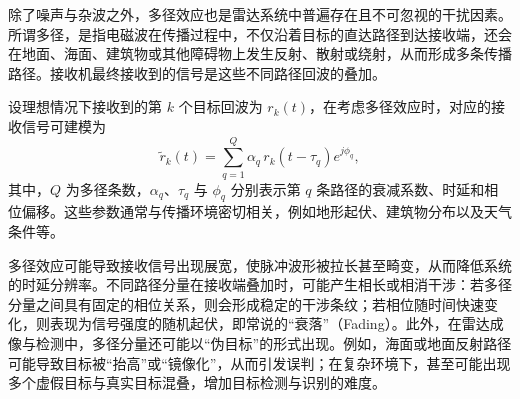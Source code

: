 除了噪声与杂波之外，多径效应也是雷达系统中普遍存在且不可忽视的干扰因素。所谓多径，是指电磁波在传播过程中，不仅沿着目标的直达路径到达接收端，还会在地面、海面、建筑物或其他障碍物上发生反射、散射或绕射，从而形成多条传播路径。接收机最终接收到的信号是这些不同路径回波的叠加。

设理想情况下接收到的第 \( k \) 个目标回波为 \( r_k(t) \)，在考虑多径效应时，对应的接收信号可建模为
\begin{equation}
    \tilde{r}_k(t) = \sum_{q=1}^{Q} \alpha_q \, r_k\!\left(t - \tau_q\right) e^{j \phi_q},
\end{equation}
其中，\( Q \) 为多径条数，\(\alpha_q\)、\(\tau_q\) 与 \(\phi_q\) 分别表示第 \( q \) 条路径的衰减系数、时延和相位偏移。这些参数通常与传播环境密切相关，例如地形起伏、建筑物分布以及天气条件等。

多径效应可能导致接收信号出现展宽，使脉冲波形被拉长甚至畸变，从而降低系统的时延分辨率。不同路径分量在接收端叠加时，可能产生相长或相消干涉：若多径分量之间具有固定的相位关系，则会形成稳定的干涉条纹；若相位随时间快速变化，则表现为信号强度的随机起伏，即常说的``衰落''（Fading）。此外，在雷达成像与检测中，多径分量还可能以``伪目标''的形式出现。例如，海面或地面反射路径可能导致目标被``抬高''或``镜像化''，从而引发误判；在复杂环境下，甚至可能出现多个虚假目标与真实目标混叠，增加目标检测与识别的难度。
